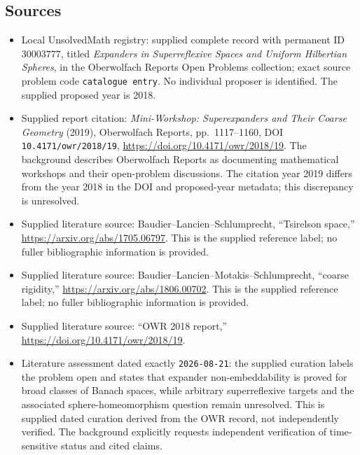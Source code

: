 \documentclass[11pt]{article}
\begin{document}
\subsection{Sources}
\begin{itemize}
\item Local UnsolvedMath registry: supplied complete record with permanent ID \(30003777\), titled \emph{Expanders in Superreflexive Spaces and Uniform Hilbertian Spheres}, in the Oberwolfach Reports Open Problems collection; exact source problem code \texttt{catalogue entry}. No individual proposer is identified. The supplied proposed year is 2018.
\item Supplied report citation: \emph{Mini-Workshop: Superexpanders and Their Coarse Geometry} (2019), Oberwolfach Reports, pp.\ 1117--1160, DOI \texttt{10.4171/owr/2018/19}, \url{https://doi.org/10.4171/owr/2018/19}. The background describes Oberwolfach Reports as documenting mathematical workshops and their open-problem discussions. The citation year 2019 differs from the year 2018 in the DOI and proposed-year metadata; this discrepancy is unresolved.
\item Supplied literature source: Baudier--Lancien--Schlumprecht, ``Tsirelson space,'' \url{https://arxiv.org/abs/1705.06797}. This is the supplied reference label; no fuller bibliographic information is provided.
\item Supplied literature source: Baudier--Lancien--Motakis--Schlumprecht, ``coarse rigidity,'' \url{https://arxiv.org/abs/1806.00702}. This is the supplied reference label; no fuller bibliographic information is provided.
\item Supplied literature source: ``OWR 2018 report,'' \url{https://doi.org/10.4171/owr/2018/19}.
\item Literature assessment dated exactly \texttt{2026-08-21}: the supplied curation labels the problem open and states that expander non-embeddability is proved for broad classes of Banach spaces, while arbitrary superreflexive targets and the associated sphere-homeomorphism question remain unresolved. This is supplied dated curation derived from the OWR record, not independently verified. The background explicitly requests independent verification of time-sensitive status and cited claims.
\end{itemize}
\end{document}
